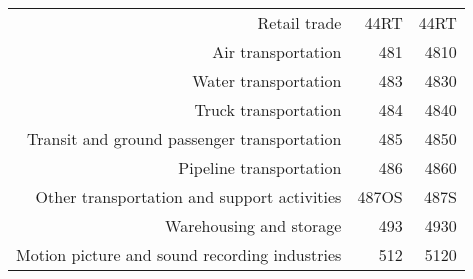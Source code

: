 \begin{table}[H]
\begin{center}
\begin{tabular}{rrr}
Retail trade                                                         & 44RT        & 44RT      \\%
Air transportation                                                   & 481         & 4810      \\%
Water transportation                                                 & 483         & 4830      \\%
Truck transportation                                                 & 484         & 4840      \\%
Transit and ground passenger transportation                          & 485         & 4850      \\%
Pipeline transportation                                              & 486         & 4860      \\%
Other transportation and support activities                          & 487OS       & 487S      \\%
Warehousing and storage                                              & 493         & 4930      \\%
Motion picture and sound recording industries                        & 512         & 5120      \\%

\end{tabular}
\end{center}
\end{table}
